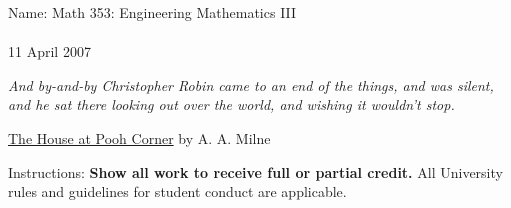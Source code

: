 \documentclass[12pt]{article}
\begin{document}
Name: \hfill Math 353: Engineering Mathematics III\\

{ \\
11 April 2007 \\}

\vspace{0.25in}

{\em And by-and-by Christopher Robin came to an end of the things, and
was silent, and he sat there looking out over the world, and wishing
it wouldn't stop.} 

\medskip

\underline{The House at Pooh Corner} by A. A. Milne


\vspace{0.25in}

Instructions: {\bf Show all work to receive full or partial credit.}
All University rules and guidelines for
student conduct are applicable.
\end{document}
